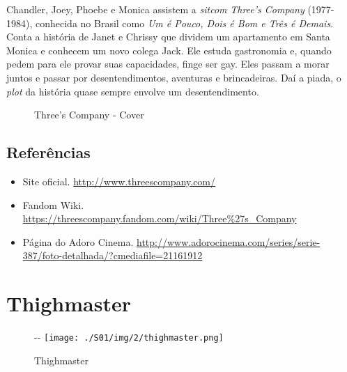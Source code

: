Chandler, Joey, Phoebe e Monica assistem a \emph{sitcom} \emph{Three's
Company} (1977-1984), conhecida no Brasil como \emph{Um é Pouco, Dois é
Bom e Três é Demais}. Conta a história de Janet e Chrissy que dividem um
apartamento em Santa Monica e conhecem um novo colega Jack. Ele estuda
gastronomia e, quando pedem para ele provar suas capacidades, finge ser
gay. Eles passam a morar juntos e passar por desentendimentos, aventuras
e brincadeiras. Daí a piada, o \emph{plot} da história quase sempre
envolve um desentendimento.

\begin{figure}
  \centering
    \caption{Three’s Company - Cover\label{fig:three-s-company-cover}}
\end{figure}

\hypertarget{referuxeancias-1}{%
\subsection{Referências}\label{referuxeancias-1}}

\begin{itemize}
\tightlist
\item
  \sloppy Site oficial. \url{http://www.threescompany.com/}
\item
  \sloppy Fandom Wiki. \url{https://threescompany.fandom.com/wiki/Three%27s_Company}
\item
  \sloppy Página do Adoro Cinema. \url{http://www.adorocinema.com/series/serie-387/foto-detalhada/?cmediafile=21161912}
\end{itemize}

\hypertarget{thighmaster}{%
\section{Thighmaster}\label{thighmaster}}

\begin{figure}[!ht]
  \begin{adjustwidth}{-\oddsidemargin-1in}{-\rightmargin}
    \centering
    \texttt{[image: ./S01/img/2/thighmaster.png]}
    \caption{Thighmaster\label{fig:thighmaster}}
  \end{adjustwidth}
\end{figure}

